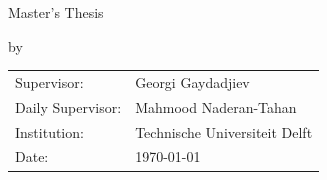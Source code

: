 \begin{titlepage}
\begin{center}

{\makeatletter
\largetitlestyle\fontsize{40}{48}\selectfont\@title
\makeatother}

{\makeatletter
\ifx\@subtitle\undefined\else
    \bigskip
    {\tudsffamily\fontsize{18}{24}\selectfont\@subtitle}
\fi
\makeatother}

\bigskip
\bigskip

Master's Thesis

\bigskip
\bigskip

by

\bigskip

{\makeatletter
\largetitlestyle\fontsize{20}{20}\selectfont\@author
\makeatother}

\vfill

\begin{tabular}{ll}
    Supervisor: & Georgi Gaydadjiev \\
    Daily Supervisor: & Mahmood Naderan-Tahan  \\
    Institution: & Technische Universiteit Delft \\
    Date: & \today
\end{tabular}

\end{center}
\end{titlepage}
